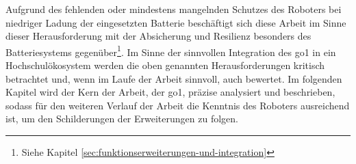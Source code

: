Aufgrund des fehlenden oder mindestens mangelnden Schutzes des Roboters bei niedriger Ladung der eingesetzten Batterie
beschäftigt sich diese Arbeit im Sinne dieser Herausforderung mit der Absicherung und Resilienz besonders des Batteriesystems
gegenüber\footnote{Siehe Kapitel \ref{sec:funktionserweiterungen-und-integration}}.
Im Sinne der sinnvollen Integration des \gls{go1} in ein Hochschulökosystem werden die oben genannten Herausforderungen
kritisch betrachtet und, wenn im Laufe der Arbeit sinnvoll, auch bewertet.
Im folgenden Kapitel wird der Kern der Arbeit, der \gls{go1}, präzise analysiert und beschrieben, sodass für den
weiteren Verlauf der Arbeit die Kenntnis des Roboters ausreichend ist, um den Schilderungen der Erweiterungen zu folgen.

